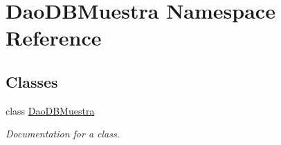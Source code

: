 \hypertarget{namespace_dao_d_b_muestra}{}\section{Dao\+D\+B\+Muestra Namespace Reference}
\label{namespace_dao_d_b_muestra}
\subsection*{Classes}
\begin{DoxyCompactItemize}
\item 
class \mbox{\hyperlink{class_dao_d_b_muestra_1_1_dao_d_b_muestra}{Dao\+D\+B\+Muestra}}
\begin{DoxyCompactList}\small\item\em Documentation for a class. \end{DoxyCompactList}\end{DoxyCompactItemize}
